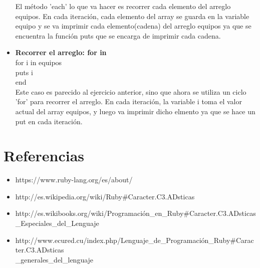 \documentclass[11pt]{article} %
\begin{document}
\begin{itemize}
     El método 'each' lo que va hacer es recorrer cada elemento del arreglo equipos. En cada iteración, cada elemento del array se guarda en la variable equipo y se va imprimir cada elemento(cadena) del arreglo equipos ya que se encuentra la función puts que se encarga de        imprimir cada cadena.

     \item {\bf Recorrer el arreglo: for in}\\
	\hspace*{7mm} for i in equipos\\
  	\hspace*{14mm}  puts i\\
	\hspace*{7mm} end\\
     \hspace*{7mm} Este caso es parecido al ejercicio anterior, sino que ahora se utiliza un ciclo 'for' para recorrer el arreglo. En cada iteración, la variable i toma el valor actual del array equipos, y luego va imprimir dicho elmento ya que se hace un put en cada iteración.\\

\end{itemize}


\section{Referencias}
\begin{itemize}
          \item  https://www.ruby-lang.org/es/about/ \\
	\item http://es.wikipedia.org/wiki/Ruby\#Caracter.C3.ADsticas \\
	\item  http://es.wikibooks.org/wiki/Programación\_en\_Ruby\#Caracter.C3.ADsticas\\
\_Especiales\_del\_Lenguaje \\
	 \item http://www.ecured.cu/index.php/Lenguaje\_de\_Programación\_Ruby\#Caracter.C3.ADsticas\\
\_generales\_del\_lenguaje \\

\end{itemize}
\end{document}
